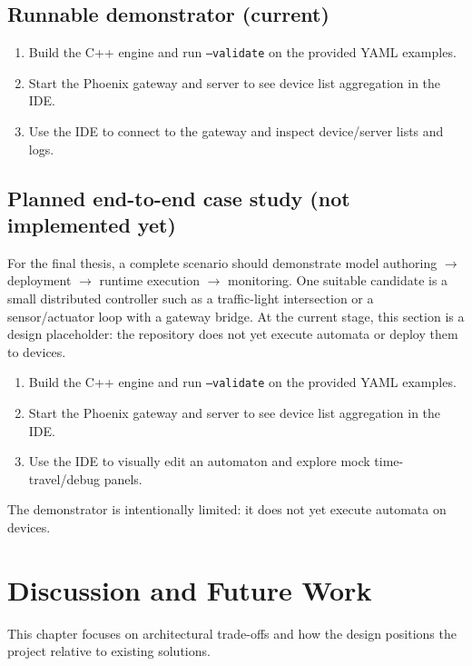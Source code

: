 \section{Runnable demonstrator (current)}
\begin{enumerate}
  \item Build the C++ engine and run \texttt{--validate} on the provided YAML examples.
  \item Start the Phoenix gateway and server to see device list aggregation in the IDE.
  \item Use the IDE to connect to the gateway and inspect device/server lists and logs.
\end{enumerate}

\section{Planned end-to-end case study (not implemented yet)}

For the final thesis, a complete scenario should demonstrate model authoring $\rightarrow$ deployment $\rightarrow$ runtime execution $\rightarrow$ monitoring.
One suitable candidate is a small distributed controller such as a traffic-light intersection or a sensor/actuator loop with a gateway bridge.
At the current stage, this section is a design placeholder: the repository does not yet execute automata or deploy them to devices.
\begin{enumerate}
  \item Build the C++ engine and run \texttt{--validate} on the provided YAML examples.
  \item Start the Phoenix gateway and server to see device list aggregation in the IDE.
  \item Use the IDE to visually edit an automaton and explore mock time-travel/debug panels.
\end{enumerate}

The demonstrator is intentionally limited: it does not yet execute automata on devices.

\chapter{Discussion and Future Work}
\label{ch:future}

This chapter focuses on architectural trade-offs and how the design positions the project relative to existing solutions.


